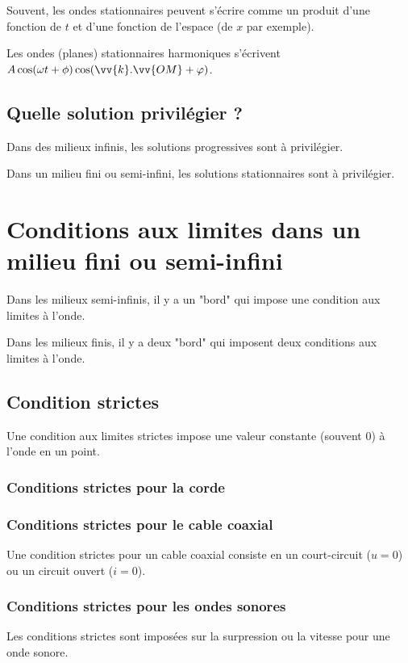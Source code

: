 Souvent, les ondes stationnaires peuvent s'écrire comme un produit d'une fonction de $t$ et d'une fonction de l'espace (de $x$ par exemple).

Les ondes (planes) stationnaires harmoniques s'écrivent $A\cos(\omega t + \phi)\cos(\vv{k} . \vv{OM} + \varphi)$.

\subsection{Quelle solution privilégier ?}
Dans des milieux infinis, les solutions progressives sont à privilégier.

Dans un milieu fini ou semi-infini, les solutions stationnaires sont à privilégier.

\section{Conditions aux limites dans un milieu fini ou semi-infini}
Dans les milieux semi-infinis, il y a un "bord" qui impose une condition aux limites à l'onde.

Dans les milieux finis, il y a deux "bord" qui imposent deux conditions aux limites à l'onde.
\subsection{Condition strictes}
Une condition aux limites strictes impose une valeur constante (souvent $0$) à l'onde en un point.
\subsubsection{Conditions strictes pour la corde}
\subsubsection{Conditions strictes pour le cable coaxial}
Une condition strictes pour un cable coaxial consiste en un court-circuit ($u=0$) ou un circuit ouvert ($i=0$).
\subsubsection{Conditions strictes pour les ondes sonores}
Les conditions strictes sont imposées sur la surpression ou la vitesse pour une onde sonore.
